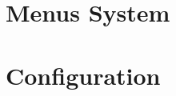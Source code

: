 \documentclass{report}
\begin{document}
\tableofcontents
\newpage

\chapter{Menus System}


\chapter{Configuration}

\end{document}
